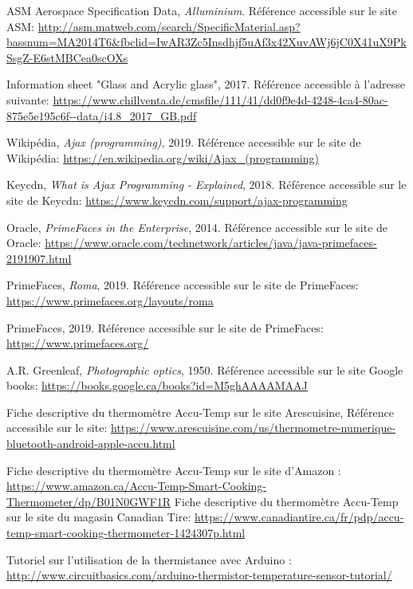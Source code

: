 \begin{thebibliographyUL}{9}
 ASM Aerospace Specification Data, \emph{Alluminium}. Référence accessible sur le site ASM: \url{http://asm.matweb.com/search/SpecificMaterial.asp?bassnum=MA2014T6&fbclid=IwAR3Zc5Insdhjf5uAf3x42XuvAWj6jC0X41uX9PkSsgZ-E6stMBCea0scOXs}

 Information sheet "Glass and Acrylic glass", 2017. Référence accessible à l'adresse suivante: \url{https://www.chillventa.de/cmsfile/111/41/dd0f9e4d-4248-4ca4-80ac-875e5e195c6f--data/i4.8_2017_GB.pdf}

 Wikipédia, \emph{Ajax (programming)}, 2019. Référence accessible sur le site de Wikipédia: \url{https://en.wikipedia.org/wiki/Ajax_(programming)}

 Keycdn, \emph{What is Ajax Programming - Explained}, 2018. Référence accessible sur le site de Keycdn: \url{https://www.keycdn.com/support/ajax-programming}

 Oracle, \emph{PrimeFaces in the Enterprise}, 2014. Référence accessible sur le site de Oracle: \url{https://www.oracle.com/technetwork/articles/java/java-primefaces-2191907.html}

 PrimeFaces, \emph{Roma}, 2019. Référence accessible sur le site de PrimeFaces: \url{https://www.primefaces.org/layouts/roma}

 PrimeFaces, 2019. Référence accessible sur le site de PrimeFaces: \url{https://www.primefaces.org/}

 A.R. Greenleaf, \emph{Photographic optics}, 1950. Référence accessible sur le site Google books: \url{https://books.google.ca/books?id=M5ghAAAAMAAJ}

 Fiche descriptive du thermomètre Accu-Temp sur le site Arescuisine, Référence accessible sur le site: \url{https://www.arescuisine.com/us/thermometre-numerique-bluetooth-android-apple-accu.html}

 Fiche descriptive du thermomètre Accu-Temp sur le site d'Amazon : \url{https://www.amazon.ca/Accu-Temp-Smart-Cooking-Thermometer/dp/B01N0GWF1R}
Fiche descriptive du thermomètre Accu-Temp sur le site du magasin Canadian Tire:
\url{https://www.canadiantire.ca/fr/pdp/accu-temp-smart-cooking-thermometer-1424307p.html}

 Tutoriel sur l’utilisation de la thermistance avec Arduino : 
\url{http://www.circuitbasics.com/arduino-thermistor-temperature-sensor-tutorial/}


\end{thebibliographyUL}
